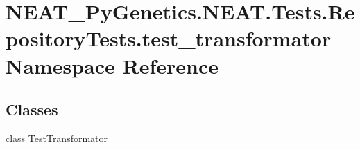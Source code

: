 \hypertarget{namespaceNEAT__PyGenetics_1_1NEAT_1_1Tests_1_1RepositoryTests_1_1test__transformator}{}\section{N\+E\+A\+T\+\_\+\+Py\+Genetics.\+N\+E\+A\+T.\+Tests.\+Repository\+Tests.\+test\+\_\+transformator Namespace Reference}
\label{namespaceNEAT__PyGenetics_1_1NEAT_1_1Tests_1_1RepositoryTests_1_1test__transformator}
\subsection*{Classes}
\begin{DoxyCompactItemize}
\item 
class \hyperlink{classNEAT__PyGenetics_1_1NEAT_1_1Tests_1_1RepositoryTests_1_1test__transformator_1_1TestTransformator}{Test\+Transformator}
\end{DoxyCompactItemize}
